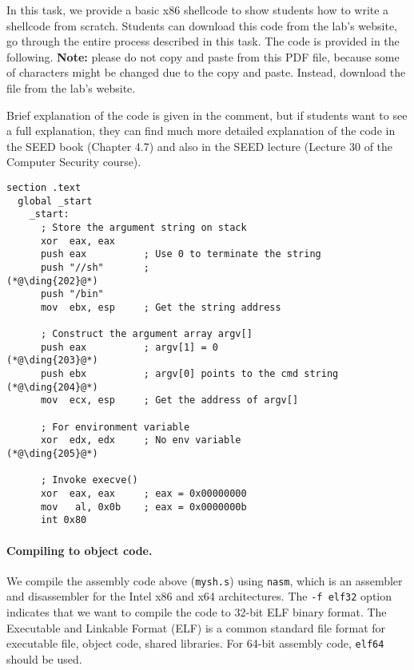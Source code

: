In this task, we provide a basic x86 shellcode to show students 
how to write a shellcode from scratch. Students 
can download this code from the lab's website, go through
the entire process described in this task. 
The code is 
provided in the following. \textbf{Note:} please do not copy and paste from
this PDF file, because some of characters might be changed
due to the copy and paste. Instead, download the file from
the lab's website. 

Brief explanation of the code is given in the comment, but if students 
want to see a full explanation, they can find much more detailed explanation 
of the code in the SEED book (Chapter 4.7) and also 
in the SEED lecture (Lecture 30 of the Computer Security course). 


\begin{lstlisting}[caption={A basic shellcode example \texttt{mysh.s}}]
section .text
  global _start
    _start:
      ; Store the argument string on stack
      xor  eax, eax
      push eax          ; Use 0 to terminate the string  
      push "//sh"       ;                                  (*@\ding{202}@*)
      push "/bin"
      mov  ebx, esp     ; Get the string address

      ; Construct the argument array argv[]
      push eax          ; argv[1] = 0                      (*@\ding{203}@*)
      push ebx          ; argv[0] points to the cmd string (*@\ding{204}@*)
      mov  ecx, esp     ; Get the address of argv[]

      ; For environment variable 
      xor  edx, edx     ; No env variable                  (*@\ding{205}@*)

      ; Invoke execve()
      xor  eax, eax     ; eax = 0x00000000
      mov   al, 0x0b    ; eax = 0x0000000b 
      int 0x80
\end{lstlisting}


\paragraph{Compiling to object code.}
We compile the assembly code above (\texttt{mysh.s}) using \texttt{nasm}, which 
is an assembler and disassembler for the Intel x86 and x64 architectures.
The \texttt{-f elf32} option indicates that we want to compile the code
to 32-bit ELF binary format. The Executable and Linkable Format (ELF) 
is a common standard file format for executable file, object code, shared libraries. 
For 64-bit assembly code, \texttt{elf64} should be used. 

